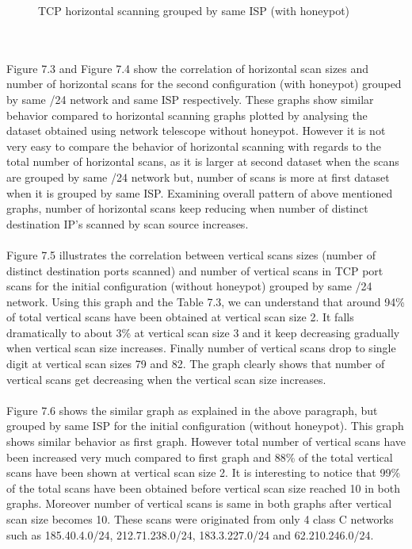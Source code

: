 \begin{figure}[ht]
\begin{minipage}{.535\textwidth}
  \caption{TCP horizontal scanning grouped by same ISP (with honeypot)}
  \label{fig:march_isp}
\end{minipage}
\end{figure}
\\\\
Figure 7.3 and Figure 7.4 show the correlation of horizontal scan sizes and number of horizontal scans for the second configuration (with honeypot) grouped by same /24 network and same ISP respectively.
These graphs show similar behavior compared to horizontal scanning graphs plotted by analysing the dataset obtained using network telescope without honeypot.
However it is not very easy to compare the behavior of horizontal scanning with regards to the total number of horizontal scans, as it is larger at second dataset when the scans are grouped by same /24 network but, number of scans is more at first dataset when it is grouped by same ISP.
Examining overall pattern of above mentioned graphs, number of horizontal scans keep reducing when number of distinct destination IP's scanned by scan source increases.
\\\\
Figure 7.5 illustrates the correlation between vertical scans sizes (number of distinct destination ports scanned) and number of vertical scans in TCP port scans for the initial configuration (without honeypot) grouped by same /24 network.
Using this graph and the Table 7.3, we can understand that around 94\% of total vertical scans have been obtained at vertical scan size 2.
It falls dramatically to about 3\% at vertical scan size 3 and it keep decreasing gradually when vertical scan size increases.
Finally number of vertical scans drop to single digit  at vertical scan sizes 79 and 82. 
The graph clearly shows that number of vertical scans get decreasing when the vertical scan size increases.\\\\
Figure 7.6 shows the similar graph as explained in the above paragraph, but grouped by same ISP for the initial configuration (without honeypot).
This graph shows similar behavior as first graph.
However total number of vertical scans have been increased very much compared to first graph and 88\% of the total vertical scans have been shown at vertical scan size 2.
It is interesting to notice that 99\% of the total scans have been obtained before vertical scan size reached 10 in both graphs.
Moreover number of vertical scans is same in both graphs after vertical scan size becomes 10.
These scans were originated from only 4 class C networks such as 185.40.4.0/24, 212.71.238.0/24, 183.3.227.0/24 and 62.210.246.0/24.
